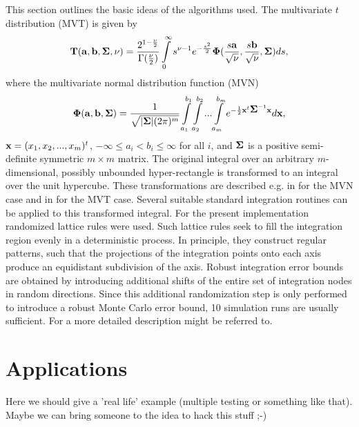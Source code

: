 \documentclass[11pt]{amsart}
\newcommand{\ba}{{\bf a}}
\newcommand{\bb}{{\bf b}}
\newcommand{\bx}{{\bf x}}
\newcommand{\bT}{{\bf T}}
\newcommand{\Sig}{\mbox{\boldmath $\Sigma$}}
\newcommand{\Ph}{\mbox{\boldmath $\Phi$}}
\begin{document}
This section outlines the basic ideas of the algorithms used. The
multivariate $t$ distribution (MVT) is given by $$ \bT(\ba, \bb,
\Sig, \nu) = \frac{2^{1-\frac{\nu}{2}}}{\Gamma(\frac{\nu}{2})}
\int\limits_0^{\infty}s^{\nu-1}e^{-\frac{s^2}{2}}
\Ph(\frac{s\ba}{\sqrt{\nu}},\frac{s\bb}{\sqrt{\nu}},\Sig) ds, $$
where the multivariate normal distribution function (MVN) $$
\Ph(\ba,\bb, \Sig) = \frac{1}{\sqrt{|\Sig| (2\pi)^m}}
\int\limits_{a_1}^{b_1} \int\limits_{a_2}^{b_2} ...
\int\limits_{a_m}^{b_m} e^{- \frac{1}{2} \bx^t \Sig^{-1} \bx}
d\bx, $$ $\bx = (x_1, x_2, ..., x_m)^t$, $-\infty \leq a_i < b_i
\leq \infty$ for all $i$, and $\Sig$ is a positive semi-definite
symmetric $m \times m$ matrix. The original integral over an
arbitrary $m$-dimensional, possibly unbounded hyper-rectangle is
transformed to an integral over the unit hypercube. These
transformations are described e.g. in \cite{numerical-:1992} for the MVN
case and in \cite{numerical-:1999} for the MVT case. Several
suitable standard integration routines can be applied to this
transformed integral. For the present implementation randomized
lattice rules were used. Such lattice rules seek to fill the
integration region evenly in a deterministic process. In
principle, they construct regular patterns, such that the
projections of the integration points onto each axis produce an
equidistant subdivision of the axis. Robust integration error
bounds are obtained by introducing additional shifts of the
entire set of integration nodes in random directions. Since this
additional randomization step is only performed to introduce a
robust Monte Carlo error bound, 10 simulation runs are usually
sufficient. For a more detailed description \cite{numerical-:1999}
might be referred to.

\section{Applications}

Here we should give a 'real life' example (multiple testing or something
like that). Maybe we can bring someone to the idea to hack this stuff ;-)



\end{document}

